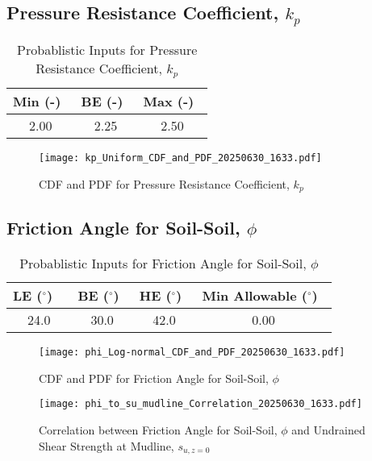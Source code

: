 \documentclass{article}
\begin{document}
\subsection*{Pressure Resistance Coefficient, $k_p$}
\begin{table}[h!]
\centering
\caption{Probablistic Inputs for Pressure Resistance Coefficient, $k_p$}
\begin{tabular}{|c|c|c|}
\hline
Min (-)\ & BE (-)\ & Max (-)\ \\
\hline
2.00 & 2.25 & 2.50 \\
\hline
\end{tabular}
\end{table}
\begin{figure}[h!]
\centering
\texttt{[image: kp\_Uniform\_CDF\_and\_PDF\_20250630\_1633.pdf]}
\caption{CDF and PDF for Pressure Resistance Coefficient, $k_p$}
\end{figure}
\clearpage
\subsection*{Friction Angle for Soil-Soil, $\phi$}
\begin{table}[h!]
\centering
\caption{Probablistic Inputs for Friction Angle for Soil-Soil, $\phi$}
\begin{tabular}{|c|c|c|c|}
\hline
LE ($^\circ$) \ & BE ($^\circ$)\ & HE ($^\circ$)\ & Min Allowable ($^\circ$)\ \\
\hline
24.0 & 30.0 & 42.0 & 0.00 \\
\hline
\end{tabular}
\end{table}
\begin{figure}[h!]
\centering
\texttt{[image: phi\_Log-normal\_CDF\_and\_PDF\_20250630\_1633.pdf]}
\caption{CDF and PDF for Friction Angle for Soil-Soil, $\phi$}
\end{figure}
\begin{figure}[h!]
\centering
\texttt{[image: phi\_to\_su\_mudline\_Correlation\_20250630\_1633.pdf]}
\caption{Correlation between Friction Angle for Soil-Soil, $\phi$ and Undrained Shear Strength at Mudline, $s_{{u,z=0}}$}
\end{figure}
\clearpage
\end{document}
